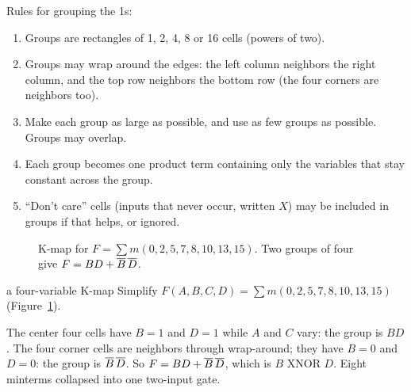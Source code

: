 Rules for grouping the 1s:
\begin{enumerate}
  \item Groups are rectangles of 1, 2, 4, 8 or 16 cells (powers of two).
  \item Groups may wrap around the edges: the left column neighbors the right column, and the top row neighbors the bottom row (the four corners are neighbors too).
  \item Make each group as large as possible, and use as few groups as possible. Groups may overlap.
  \item Each group becomes one product term containing only the variables that stay constant across the group.
  \item ``Don't care'' cells (inputs that never occur, written $X$) may be included in groups if that helps, or ignored.
\end{enumerate}

\begin{figure}[h]
\centering
{}
\caption{K-map for $F = \sum m(0,2,5,7,8,10,13,15)$. Two groups of four give $F = BD + \overline{B}\,\overline{D}$.}
\label{fig:kmap}
\end{figure}

\begin{worked}{a four-variable K-map}
Simplify $F(A,B,C,D) = \sum m(0,2,5,7,8,10,13,15)$ (Figure~\ref{fig:kmap}).

The center four cells have $B=1$ and $D=1$ while $A$ and $C$ vary: the group is $BD$. The four corner cells are neighbors through wrap-around; they have $B = 0$ and $D = 0$: the group is $\overline{B}\,\overline{D}$. So $F = BD + \overline{B}\,\overline{D}$, which is $B \text{ XNOR } D$. Eight minterms collapsed into one two-input gate.
\end{worked}

